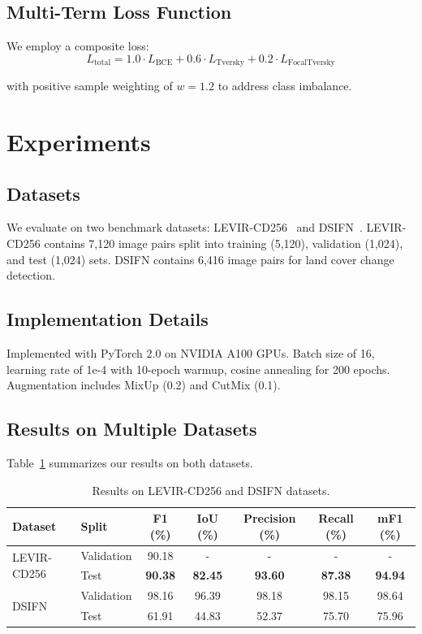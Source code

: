 \documentclass{IEEEtran}
\begin{document}
\subsection{Multi-Term Loss Function}

We employ a composite loss:
\begin{equation}
L_{\text{total}} = 1.0 \cdot L_{\text{BCE}} + 0.6 \cdot L_{\text{Tversky}} + 0.2 \cdot L_{\text{FocalTversky}}
\end{equation}

with positive sample weighting of $w=1.2$ to address class imbalance.

\section{Experiments}
\label{sec:experiments}

\subsection{Datasets}

We evaluate on two benchmark datasets: LEVIR-CD256~\cite{chen2020levir} and DSIFN~\cite{dsifn}. LEVIR-CD256 contains 7,120 image pairs split into training (5,120), validation (1,024), and test (1,024) sets. DSIFN contains 6,416 image pairs for land cover change detection.

\subsection{Implementation Details}

Implemented with PyTorch 2.0 on NVIDIA A100 GPUs. Batch size of 16, learning rate of 1e-4 with 10-epoch warmup, cosine annealing for 200 epochs. Augmentation includes MixUp (0.2) and CutMix (0.1).

\subsection{Results on Multiple Datasets}

Table~\ref{tab:multi_dataset} summarizes our results on both datasets.

\begin{table}[t]
\centering
\caption{Results on LEVIR-CD256 and DSIFN datasets.}
\label{tab:multi_dataset}
\begin{tabular}{llccccc}
\toprule
Dataset & Split & F1 (\%) & IoU (\%) & Precision (\%) & Recall (\%) & mF1 (\%) \\
\midrule
\multirow{2}{*}{LEVIR-CD256}
& Validation & 90.18 & - & - & - & - \\
& Test & \textbf{90.38} & \textbf{82.45} & \textbf{93.60} & \textbf{87.38} & \textbf{94.94} \\
\midrule
\multirow{2}{*}{DSIFN}
& Validation & 98.16 & 96.39 & 98.18 & 98.15 & 98.64 \\
& Test & 61.91 & 44.83 & 52.37 & 75.70 & 75.96 \\
\bottomrule
\end{tabular}
\end{table}
\end{document}
